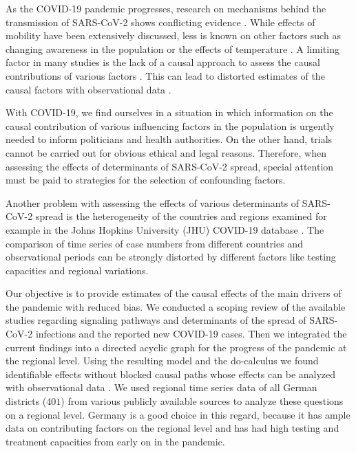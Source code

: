 \documentclass[]{elsarticle} %
\begin{document}
As the COVID-19 pandemic progresses, research on mechanisms behind the
transmission of SARS-CoV-2 shows conflicting evidence
\citep{who2020report, Chinazzi395, guan2020clinical}. While effects of
mobility have been extensively discussed, less is known on other factors
such as changing awareness in the population
\citep{higgins_correlations_2020, li_retrospective_2020, yuan_trends_2020}
or the effects of temperature
\citep{bannister-tyrrell_preliminary_2020, demongeot_temperature_2020, liu_impact_2020}.
A limiting factor in many studies is the lack of a causal approach to
assess the causal contributions of various factors
\citep{Greenland1999}. This can lead to distorted estimates of the
causal factors with observational data
\citep{Greenland1999, schipf_directed_2011, textor_robust_2017}.

With COVID-19, we find ourselves in a situation in which information on
the causal contribution of various influencing factors in the population
is urgently needed to inform politicians and health authorities. On the
other hand, trials cannot be carried out for obvious ethical and legal
reasons. Therefore, when assessing the effects of determinants of
SARS-CoV-2 spread, special attention must be paid to strategies for the
selection of confounding factors.

Another problem with assessing the effects of various determinants of
SARS-CoV-2 spread is the heterogeneity of the countries and regions
examined for example in the Johns Hopkins University (JHU) COVID-19
database \citep{jhucovid19db2020}. The comparison of time series of case
numbers from different countries and observational periods can be
strongly distorted by different factors like testing capacities and
regional variations.

Our objective is to provide estimates of the causal effects of the main
drivers of the pandemic with reduced bias. We conducted a scoping review
of the available studies regarding signaling pathways and determinants
of the spread of SARS-CoV-2 infections and the reported new COVID-19
cases. Then we integrated the current findings into a directed acyclic
graph for the progress of the pandemic at the regional level. Using the
resulting model and the do-calculus we found identifiable effects
without blocked causal paths whose effects can be analyzed with
observational data \citep{Pearl_2014}. We used regional time series data
of all German districts (\(401\)) from various publicly available
sources to analyze these questions on a regional level. Germany is a
good choice in this regard, because it has ample data on contributing
factors on the regional level and has had high testing and treatment
capacities from early on in the pandemic.
\end{document}
